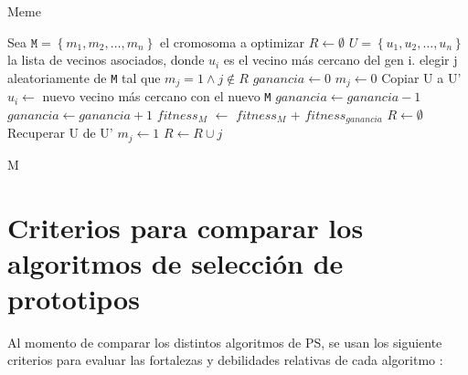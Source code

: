 \begin{algorithm}
\caption{Meme}
\label{meme}
\begin{algorithmic}[1]


\State Sea $\texttt{M} = \left\{ m_1,m_2,\dots,m_n \right\}$ el cromosoma a optimizar 
\State $R \gets \emptyset$
\State $ U = \left\{ u_1,u_2,\dots,u_n \right\}$ la lista de vecinos asociados, donde $u_i$ es el vecino más cercano del gen i. 
	\State elegir j aleatoriamente de \texttt{M} tal que $m_j=1 \land j \notin R$
	\State $ganancia \gets 0$
	\State $m_j \gets 0$
	\State Copiar U a U'
		\State $u_i \gets$ nuevo vecino más cercano con el nuevo \texttt{M}
			\State $ganancia \gets ganancia - 1$
			\State $ganancia \gets ganancia + 1$
		\EndIf
	\EndFor
		\State \emph{$fitness_M$} $\gets$ \emph{$fitness_M$} + \emph{$fitness_{ganancia}$}
		\State $R \gets \emptyset$
	\Else
		\State Recuperar U de U'
		\State $m_j \gets 1$
		\State $ R \gets R \cup j$
	\EndIf
\EndWhile

\State \Return M

\end{algorithmic}
\end{algorithm}

\section{Criterios para comparar los algoritmos de selección de prototipos}

Al momento de comparar los distintos algoritmos de PS, se usan los siguiente criterios para evaluar las fortalezas y debilidades relativas de cada algoritmo \cite{garcia2016data}:

